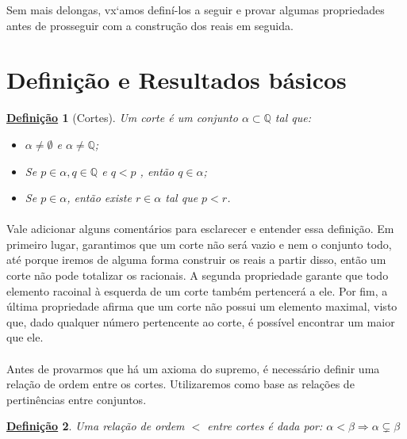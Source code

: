\documentclass{article}
\newtheorem{definition}{\underline{Defini\c c\~ao}}
\begin{document}
Sem mais delongas, vx`amos defin\'i-los a seguir e provar algumas propriedades antes de prosseguir com a constru\c c\~ao dos reais em seguida.

\section{Defini\c c\~ao e Resultados b\'asicos}
\begin{definition}[Cortes] 
Um corte \'e um conjunto $\alpha\subset\mathbb{Q}$ tal que:
\begin{itemize}
\item [i)] $\alpha\neq\emptyset$ e $\alpha\neq\mathbb{Q}$;
\item [ii)] Se $p\in\alpha, q\in\mathbb{Q}$ e $q<p$ , ent\~ao $q\in\alpha$;
\item [iii)] Se $p\in\alpha$, ent\~ao existe $r\in\alpha$ tal que $p < r$.
\end{itemize}
\end{definition}

\paragraph{} Vale adicionar alguns coment\'arios para esclarecer e entender essa defini\c c\~ao. Em primeiro lugar, garantimos que um corte n\~ao ser\'a vazio e nem o conjunto todo, at\'e porque iremos de alguma forma construir os reais a partir disso, ent\~ao um corte n\~ao pode totalizar os racionais. A segunda propriedade garante que todo elemento racoinal \`a esquerda de um corte tamb\'em pertencer\'a a ele. Por fim, a \'ultima propriedade afirma que um corte n\~ao possui um elemento maximal, visto que, dado qualquer n\'umero pertencente ao corte, \'e poss\'ivel encontrar um maior que ele.

\paragraph{} Antes de provarmos que h\'a um axioma do supremo, \'e necess\'ario definir uma rela\c c\~ao de ordem entre os cortes. Utilizaremos como base as rela\c c\~oes de pertin\^encias entre conjuntos.

\begin{definition}
Uma rela\c c\~ao de ordem $<$ entre cortes \'e dada por: $\alpha < \beta \Rightarrow \alpha\subsetneq\beta$
\end{definition}
\end{document}
